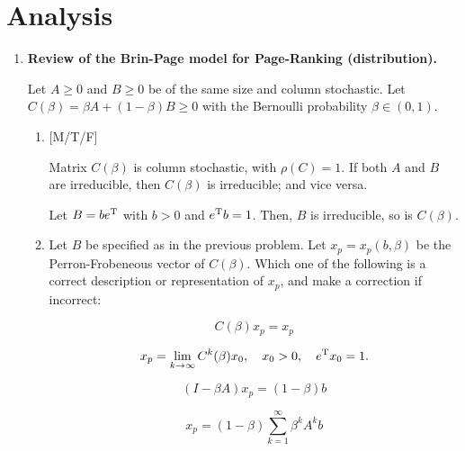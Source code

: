 %
% 
 \section*{Analysis}

 \begin{enumerate} 

      \item {\bf Review of the Brin-Page model for Page-Ranking
       (distribution).}

     Let $A\geq 0$ and $B\geq 0 $ be of the same size and column
     stochastic.  Let $C(\beta) = \beta A + (1-\beta ) B \geq 0$ with
     the Bernoulli probability $\beta \in (0,1)$.
            
     \begin{enumerate}
     \item { [M/T/F] }

       Matrix $C(\beta)$ is column stochastic, with $\rho(C)=1$. 
       If both $A$ and $B$ are irreducible, then $C(\beta)$ is
       irreducible; and vice versa.

       Let $B = be^{\rm T}$ with $b > 0$ and $e^{\rm T}b=1$.  Then,
       $B$ is irreducible, so is $C(\beta)$.
       
     \item Let $B$ be specified as in the previous problem. Let
       $x_{p} = x_{p}(b,\beta)$ be the Perron-Frobeneous vector of
       $C(\beta)$.  Which one of the following is a correct
       description or representation of $x_{p}$, and make a correction
       if incorrect: 

       \begin{equation}
         \label{eq:perron-equation}
         C(\beta) x_{p} = x_{p}
       \end{equation}

       \begin{equation}
         \label{eq:power-method-limit}
         x_{p} = \lim_{k\to \infty} C^k(\beta)x_{0},
         \quad x_{0} > 0,
         \quad e^{\rm T}x_{0} = 1. 
       \end{equation}

       \begin{equation}
         \label{eq:BP-linear-system}
         (I - \beta A) x_{p} = (1-\beta) b
       \end{equation}

       \begin{equation}
         \label{eq:Neumann-expansion}
         x_{p} = (1-\beta) \sum_{k=1}^{\infty} \beta^k A^k b
       \end{equation}


\end{enumerate}
\end{enumerate}
